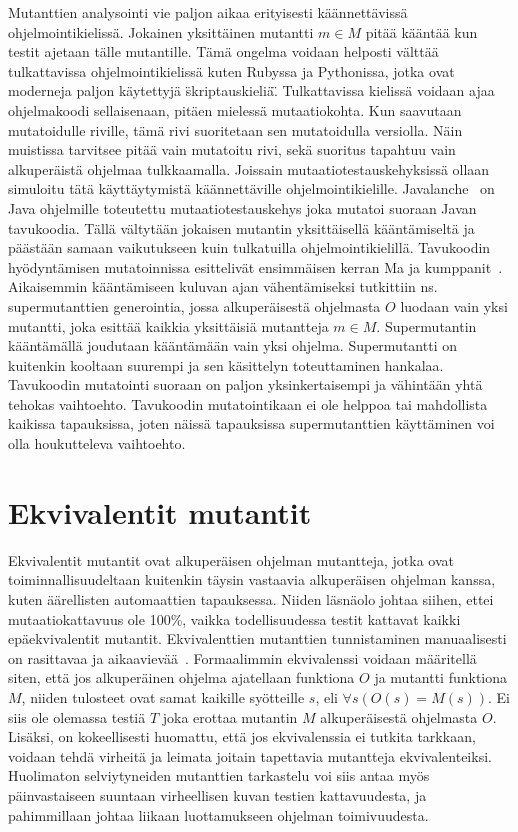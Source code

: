 \documentclass{tktltiki}
\begin{document}
Mutanttien analysointi vie paljon aikaa erityisesti käännettävissä ohjelmointikielissä. Jokainen yksittäinen mutantti $m\in M$ pitää kääntää kun testit ajetaan tälle mutantille. Tämä ongelma voidaan helposti välttää tulkattavissa ohjelmointikielissä kuten Rubyssa ja Pythonissa, jotka ovat moderneja paljon käytettyjä \"skriptauskieliä\". Tulkattavissa kielissä voidaan ajaa ohjelmakoodi sellaisenaan, pitäen mielessä mutaatiokohta. Kun saavutaan mutatoidulle riville, tämä rivi suoritetaan sen mutatoidulla versiolla. Näin muistissa tarvitsee pitää vain mutatoitu rivi, sekä suoritus tapahtuu vain alkuperäistä ohjelmaa tulkkaamalla. Joissain mutaatiotestauskehyksissä ollaan simuloitu tätä käyttäytymistä käännettäville ohjelmointikielille. Javalanche~\cite{} on Java ohjelmille toteutettu mutaatiotestauskehys joka mutatoi suoraan Javan tavukoodia. Tällä vältytään jokaisen mutantin yksittäisellä kääntämiseltä ja päästään samaan vaikutukseen kuin tulkatuilla ohjelmointikielillä. Tavukoodin hyödyntämisen mutatoinnissa esittelivät ensimmäisen kerran Ma ja kumppanit~\cite{}. Aikaisemmin kääntämiseen kuluvan ajan vähentämiseksi tutkittiin ns. supermutanttien generointia, jossa alkuperäisestä ohjelmasta $O$ luodaan vain yksi mutantti, joka esittää kaikkia yksittäisiä mutantteja $m\in M$. Supermutantin kääntämällä joudutaan kääntämään vain yksi ohjelma. Supermutantti on kuitenkin kooltaan suurempi ja sen käsittelyn toteuttaminen hankalaa. Tavukoodin mutatointi suoraan on paljon yksinkertaisempi ja vähintään yhtä tehokas vaihtoehto. Tavukoodin mutatointikaan ei ole helppoa tai mahdollista kaikissa tapauksissa, joten näissä tapauksissa supermutanttien käyttäminen voi olla houkutteleva vaihtoehto.

\section{Ekvivalentit mutantit}
Ekvivalentit mutantit ovat alkuperäisen ohjelman mutantteja, jotka ovat toiminnallisuudeltaan kuitenkin täysin vastaavia alkuperäisen ohjelman kanssa, kuten äärellisten automaattien tapauksessa. Niiden läsnäolo johtaa siihen, ettei mutaatiokattavuus ole 100\%, vaikka todellisuudessa testit kattavat kaikki epäekvivalentit mutantit. Ekvivalenttien mutanttien tunnistaminen manuaalisesti on rasittavaa ja aikaavievää~\cite{GrunSZ09}. Formaalimmin ekvivalenssi voidaan määritellä siten, että jos alkuperäinen ohjelma ajatellaan funktiona $O$ ja mutantti funktiona $M$, niiden tulosteet ovat samat kaikille syötteille $s$, eli $\forall s(O(s) = M(s))$. Ei siis ole olemassa testiä $T$ joka erottaa mutantin $M$ alkuperäisestä ohjelmasta $O$. Lisäksi, on kokeellisesti huomattu, että jos ekvivalenssia ei tutkita tarkkaan, voidaan tehdä virheitä ja leimata joitain tapettavia mutantteja ekvivalenteiksi. Huolimaton selviytyneiden mutanttien tarkastelu voi siis antaa myös päinvastaiseen suuntaan virheellisen kuvan testien kattavuudesta, ja pahimmillaan johtaa liikaan luottamukseen ohjelman toimivuudesta. %
\end{document}
